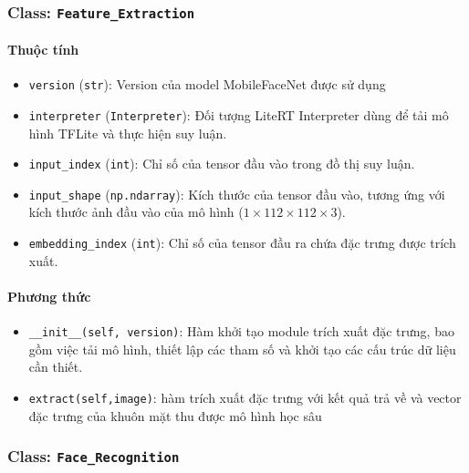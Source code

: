 \subsubsection{Class: \texttt{Feature\_Extraction}}
\paragraph{Thuộc tính}
\begin{itemize}
    \item \texttt{version} (\texttt{str}): Version của model MobileFaceNet được sử dụng
    \item \texttt{interpreter} (\texttt{Interpreter}): Đối tượng LiteRT Interpreter dùng để tải mô hình TFLite và thực hiện suy luận.
    \item \texttt{input\_index} (\texttt{int}): Chỉ số của tensor đầu vào trong đồ thị suy luận.

    \item \texttt{input\_shape} (\texttt{np.ndarray}): Kích thước của tensor đầu vào, tương ứng với kích thước ảnh đầu vào của mô hình ($1 \times 112 \times 112 \times 3$).

    \item \texttt{embedding\_index} (\texttt{int}): Chỉ số của tensor đầu ra chứa đặc trưng được trích xuất.
\end{itemize}
\paragraph{Phương thức}
\begin{itemize}
    \item \texttt{\_\_init\_\_(self, version)}:  Hàm khởi tạo module trích xuất đặc trưng, bao gồm việc tải mô hình, thiết lập các tham số và khởi tạo các cấu trúc dữ liệu cần thiết.
    \item \texttt{extract(self,image)}: hàm trích xuất đặc trưng với kết quả trả về và vector đặc trưng của khuôn mặt thu được mô hình học sâu
\end{itemize}

\subsubsection{Class: \texttt{Face\_Recognition}}
